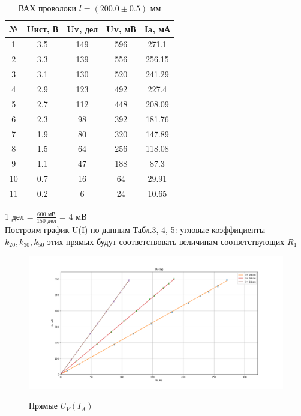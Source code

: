 \documentclass{article}
\begin{document}
	\begin{table}[H]
		\centering
		\begin{tabular}{|c|c|c|c|c|}
			\hline
			№ & Uист, В & Uv, дел & Uv, мВ & Ia, мА \\ \hline
			1 & 3.5 & 149 & 596 & 271.1 \\ \hline
			2 & 3.3 & 139 & 556 & 256.15 \\ \hline
			3 & 3.1 & 130 & 520 & 241.29 \\ \hline
			4 & 2.9 & 123 & 492 & 227.4 \\ \hline
			5 & 2.7 & 112 & 448 & 208.09 \\ \hline
			6 & 2.3 & 98 & 392 & 181.76 \\ \hline
			7 & 1.9 & 80 & 320 & 147.89 \\ \hline
			8 & 1.5 & 64 & 256 & 118.08 \\ \hline
			9 & 1.1 & 47 & 188 & 87.3 \\ \hline
			10 & 0.7 & 16 & 64 & 29.91 \\ \hline
			11 & 0.2 & 6 & 24 & 10.65 \\ \hline
		\end{tabular}
		\caption{ВАХ проволоки $l = (200.0 \pm 0.5)$ мм}
	\end{table}
	
	1 дел = $\frac{600 \text{ мВ}}{150 \text{ дел}}$ = 4 мВ\\
	
	Построим график U(I) по данным Табл.3, 4, 5: угловые коэффициенты $k_{20}, k_{30}, k_{50}$ этих прямых будут соответствовать величинам соответствующих ${R_{1}}$ 
	
	
	\begin{figure}[H]
		\centering
		 {
			\includegraphics[width = 1.4\linewidth]{Figure_2.png}}
		\caption{Прямые $U_{V}(I_{A})$ }
		\label{fig:enter-label}
	\end{figure}
	
\end{document}
